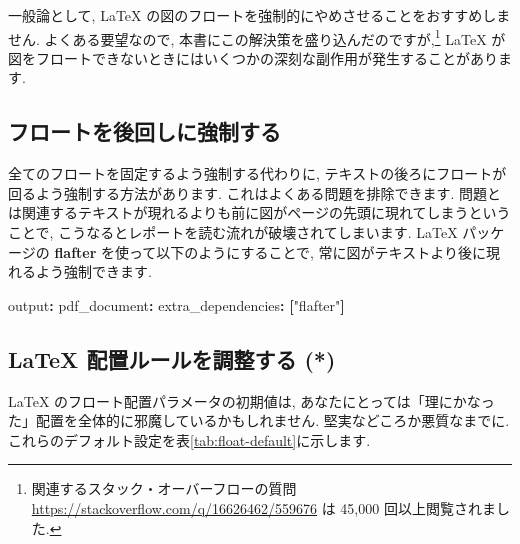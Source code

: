 \documentclass[
  11pt,
  lualatex,ja=standard,jafont=noto]{bxjsreport}
\newenvironment{Shaded}{\begin{snugshade}}{\end{snugshade}}
\newcommand{\AttributeTok}[1]{\textcolor[rgb]{0.77,0.63,0.00}{#1}}
\newcommand{\FunctionTok}[1]{\textcolor[rgb]{0.00,0.00,0.00}{#1}}
\newcommand{\KeywordTok}[1]{\textcolor[rgb]{0.13,0.29,0.53}{\textbf{#1}}}
\newcommand{\NormalTok}[1]{#1}
\newcommand{\SpecialCharTok}[1]{\textcolor[rgb]{0.00,0.00,0.00}{#1}}
\newcommand{\StringTok}[1]{\textcolor[rgb]{0.31,0.60,0.02}{#1}}
\begin{document}
\begin{Shaded}
\end{Shaded}

一般論として, LaTeX の図のフロートを強制的にやめさせることをおすすめしません. よくある要望なので, 本書にこの解決策を盛り込んだのですが,\footnote{関連するスタック・オーバーフローの質問 \url{https://stackoverflow.com/q/16626462/559676} は 45,000 回以上閲覧されました.} LaTeX が図をフロートできないときにはいくつかの深刻な副作用が発生することがあります.

\hypertarget{force-floats-forward}{%
\subsection{フロートを後回しに強制する}\label{force-floats-forward}}

全てのフロートを固定するよう強制する代わりに, テキストの後ろにフロートが回るよう強制する方法があります. これはよくある問題を排除できます. 問題とは関連するテキストが現れるよりも前に図がページの先頭に現れてしまうということで, こうなるとレポートを読む流れが破壊されてしまいます. LaTeX パッケージの \textbf{flafter} を使って以下のようにすることで, 常に図がテキストより後に現れるよう強制できます.

\begin{Shaded}
\begin{Highlighting}[]
\FunctionTok{output}\KeywordTok{:}\AttributeTok{ }
\AttributeTok{  }\FunctionTok{pdf\_document}\KeywordTok{:}
\AttributeTok{    }\FunctionTok{extra\_dependencies}\KeywordTok{:}\AttributeTok{ }\KeywordTok{[}\StringTok{"flafter"}\KeywordTok{]}
\end{Highlighting}
\end{Shaded}

\hypertarget{latex-ux914dux7f6eux30ebux30fcux30ebux3092ux8abfux6574ux3059ux308b}{%
\subsection{LaTeX 配置ルールを調整する (*)}\label{latex-ux914dux7f6eux30ebux30fcux30ebux3092ux8abfux6574ux3059ux308b}}

LaTeX のフロート配置パラメータの初期値は, あなたにとっては「理にかなった」配置を全体的に邪魔しているかもしれません. 堅実などころか悪質なまでに. これらのデフォルト設定を表\ref{tab:float-default}に示します.
\end{document}
